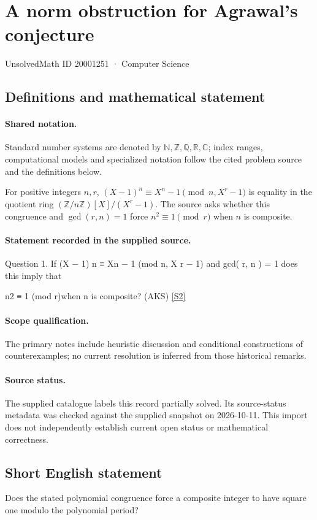 \documentclass[11pt]{article}
\newcommand{\sref}[2]{\hyperlink{source:#1:#2}{[S#2]}}
\begin{document}
\setcounter{section}{20001250}
\section{A norm obstruction for Agrawal's conjecture}\label{20001251}
{\small\sffamily UnsolvedMath ID 20001251 · Computer Science}
\subsection{Definitions and mathematical statement}

\paragraph{Shared notation.}Standard number systems are denoted by $\mathbb N,\mathbb Z,\mathbb Q,\mathbb R,\mathbb C$; index ranges, computational models and specialized notation follow the cited problem source and the definitions below.


For positive integers $n,r$, $(X-1)^n\equiv X^n-1\pmod{n,X^r-1}$ is equality in the quotient ring $(\mathbb Z/n\mathbb Z)[X]/(X^r-1)$. The source asks whether this congruence and $\gcd(r,n)=1$ force $n^2\equiv1\pmod r$ when $n$ is composite.
\paragraph{Statement recorded in the supplied source.}
Question 1. If (X − 1) n ≡ Xn − 1 (mod n, X r − 1) and gcd( r, n ) = 1 does this imply that

n2 ≡ 1 (mod r)when n is composite? (AKS) \sref{20001251}{2}
\paragraph{Scope qualification.}
The primary notes include heuristic discussion and conditional constructions of counterexamples; no current resolution is inferred from those historical remarks.
\paragraph{Source status.}
The supplied catalogue labels this record partially solved. Its source-status metadata was checked against the supplied snapshot on 2026-10-11. This import does not independently establish current open status or mathematical correctness.
\subsection{Short English statement}
Does the stated polynomial congruence force a composite integer to have square one modulo the polynomial period?
\end{document}
